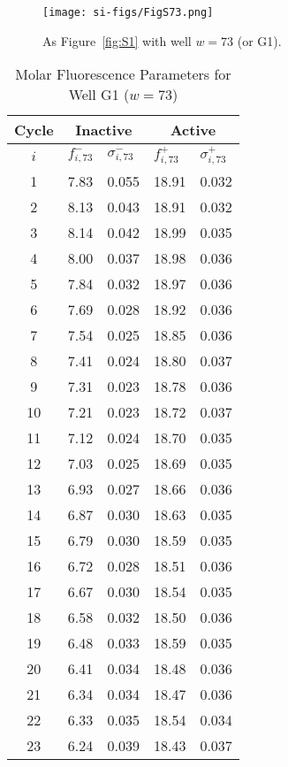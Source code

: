                 \begin{figure}
                    \centering
                    \texttt{[image: si-figs/FigS73.png]}
                    \caption{
                        As Figure~\ref{fig:S1} with well $w=73$ (or G1).
                    }
                \end{figure}
                \clearpage
    \begin{table}
        \caption{Molar Fluorescence Parameters for Well G1 ($w=73$)}
        \centering
        \begin{tabular}{c|ll|ll}
            Cycle & \multicolumn{2}{c|}{Inactive} & \multicolumn{2}{c}{Active} \\
            \hline
            $i$ & $f_{i,73}^{-}$ & $\sigma_{i,73}^{-}$ &  $f_{i,73}^{+}$ & $\sigma_{i,73}^{+}$ \\
            \hline
    1 & 7.83 & 0.055 & 18.91 & 0.032 \\
2 & 8.13 & 0.043 & 18.91 & 0.032 \\
3 & 8.14 & 0.042 & 18.99 & 0.035 \\
4 & 8.00 & 0.037 & 18.98 & 0.036 \\
5 & 7.84 & 0.032 & 18.97 & 0.036 \\
6 & 7.69 & 0.028 & 18.92 & 0.036 \\
7 & 7.54 & 0.025 & 18.85 & 0.036 \\
8 & 7.41 & 0.024 & 18.80 & 0.037 \\
9 & 7.31 & 0.023 & 18.78 & 0.036 \\
10 & 7.21 & 0.023 & 18.72 & 0.037 \\
11 & 7.12 & 0.024 & 18.70 & 0.035 \\
12 & 7.03 & 0.025 & 18.69 & 0.035 \\
13 & 6.93 & 0.027 & 18.66 & 0.036 \\
14 & 6.87 & 0.030 & 18.63 & 0.035 \\
15 & 6.79 & 0.030 & 18.59 & 0.035 \\
16 & 6.72 & 0.028 & 18.51 & 0.036 \\
17 & 6.67 & 0.030 & 18.54 & 0.035 \\
18 & 6.58 & 0.032 & 18.50 & 0.036 \\
19 & 6.48 & 0.033 & 18.59 & 0.035 \\
20 & 6.41 & 0.034 & 18.48 & 0.036 \\
21 & 6.34 & 0.034 & 18.47 & 0.036 \\
22 & 6.33 & 0.035 & 18.54 & 0.034 \\
23 & 6.24 & 0.039 & 18.43 & 0.037 \\

\end{tabular}
\end{table}
